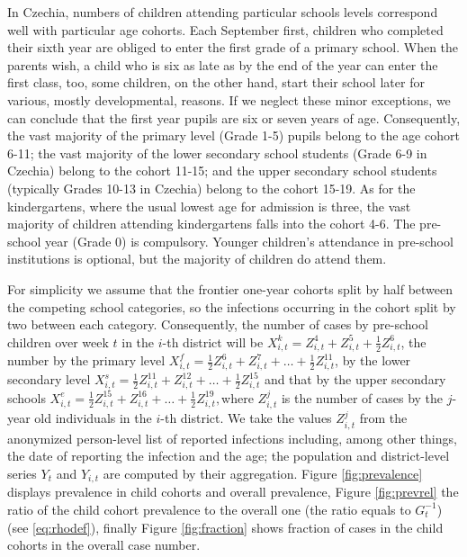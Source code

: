 \documentclass[fleqn,10pt]{wlscirep}
\begin{document}
In Czechia, numbers of children attending particular schools levels correspond well with particular age cohorts. Each September first, children who completed
their sixth year are obliged to enter the first grade of a primary
school. When the parents wish, a child who is six as late as by the
end of the year can enter the first class, too, some children, on
the other hand, start their school later for various, mostly developmental,
reasons. If we neglect these minor exceptions, we can conclude that the
first year pupils are six or seven years of age. Consequently, the vast majority of the primary level 
(Grade 1-5) pupils belong to the age cohort 6-11; the vast majority of the lower secondary school students (Grade 6-9 in Czechia) belong to the cohort 11-15; and 
the upper secondary school students (typically Grades 10-13 in Czechia) belong to the cohort 15-19. As for the kindergartens, where the usual lowest
age for admission is three, the vast majority
of children attending kindergartens falls into the cohort 4-6. The pre-school year (Grade 0) is compulsory. Younger children's attendance in pre-school institutions is optional, but the majority of children do attend them.

For simplicity we assume that the frontier one-year cohorts split
by half between the competing school categories, so the infections
occurring in the cohort split by two between each category. 
Consequently, the number of cases by pre-school children over week $t$ in
the $i$-th district will be $X_{i,t}^{k}=Z_{i,t}^{4}+Z_{i,t}^{5}+\frac{1}{2}Z_{i,t}^{6}$,
the number by the primary level  $X_{i,t}^{f}=\frac{1}{2}Z_{i,t}^{6}+Z_{i,t}^{7}+\dots+\frac{1}{2}Z_{i,t}^{11}$,
by the lower secondary level $X_{i,t}^{s}=\frac{1}{2}Z_{i,t}^{11}+Z_{i,t}^{12}+\dots+\frac{1}{2}Z_{i,t}^{15}$
and that by the upper secondary schools $X_{i,t}^{e}=\frac{1}{2}Z_{i,t}^{15}+Z_{i,t}^{16}+\dots+\frac{1}{2}Z_{i,t}^{19},$where
$Z_{i,t}^{j}$ is the number of cases by the $j$-year old individuals
in the $i$-th district. 
We take the values $Z^j_{i,t}$ from the anonymized person-level list of reported infections
\cite{osoby} including, among other things, the date of reporting
the infection and the age; the population and district-level series $Y_t$ and $Y_{i,t}$ are computed by their aggregation. Figure \ref{fig:prevalence} displays prevalence in  child cohorts and overall prevalence, Figure \ref{fig:prevrel} the ratio of the child cohort prevalence to the overall one (the ratio equals to $G^{-1}_{t}$) (see \ref{eq:rhodef}), finally Figure \ref{fig:fraction} shows fraction of cases in the child cohorts in the overall case number.
\end{document}
